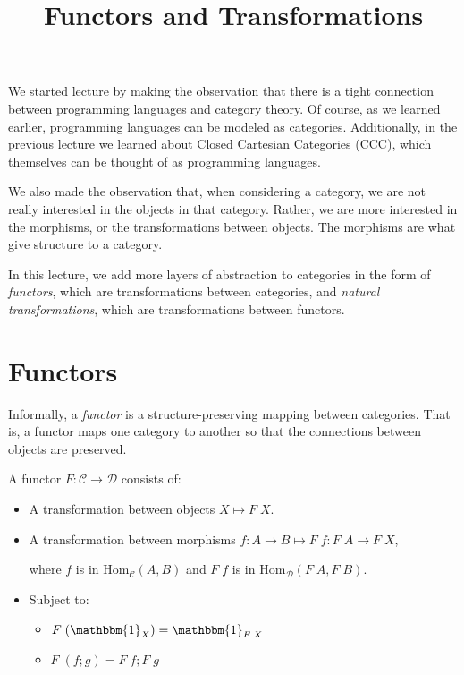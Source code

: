 \documentclass{lecturenotes}
\title{Functors and Transformations}
\newcommand{\app}[2]{\ensuremath{#1\;#2}}
\renewcommand{\hom}[3][]{\ensuremath{\text{Hom}_{#1}(#2, #3)}}
\newcommand{\id}[1][]{\ensuremath{\mathbbm{1}_{#1}}}
\begin{document}
\maketitle

We started lecture by making the observation that there is a tight connection between programming languages and category theory.
Of course, as we learned earlier, programming languages can be modeled as categories.
Additionally, in the previous lecture we learned about Closed Cartesian Categories (CCC), which themselves can be thought of as programming languages.

We also made the observation that, when considering a category, we are not really interested in the objects in that category.
Rather, we are more interested in the morphisms, or the transformations between objects.
The morphisms are what give structure to a category.

In this lecture, we add more layers of abstraction to categories in the form of \emph{functors}, which are transformations between categories, and \emph{natural transformations}, which are transformations between functors.

\section{Functors}

Informally, a \emph{functor} is a structure-preserving mapping between categories.
That is, a functor maps one category to another so that the connections between objects are preserved.

\begin{defn}[Functor]
  A functor $F : \mathcal{C} \to \mathcal{D}$ consists of:

  \begin{itemize}
    \item A transformation between objects $X \mapsto \app{F}{X}$.
    \item A transformation between morphisms $f : A \to B \mapsto \app{F}{f} : \app{F}{A} \to \app{F}{X}$,
    
    \;where $f$ is in $\hom[\mathcal{C}]{A}{B}$ and $\app{F}{f}$ is in $\hom[\mathcal{D}]{\app{F}{A}}{\app{F}{B}}$.

    \item Subject to:
    \begin{itemize}
      \item $\app{F}{(\id[X])} = \id[\app{F}{X}]$
      \item $\app{F}{(f ; g)} = \app{F}{f}; \app{F}{g}$
    \end{itemize}
  \end{itemize}
\end{defn}
\end{document}
